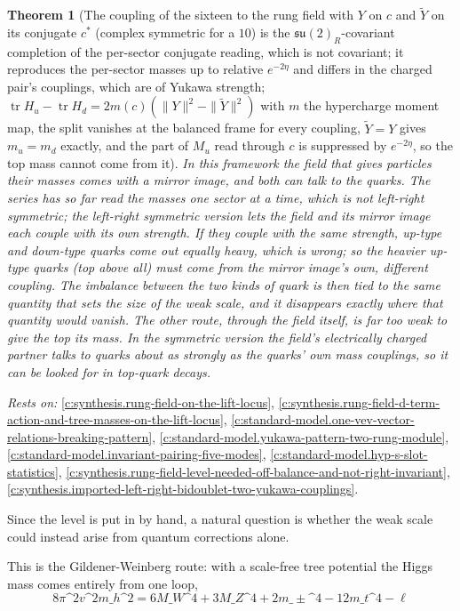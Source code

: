 \documentclass[11pt]{article}
\newtheorem{theorem}{Theorem}[section]
\theoremstyle{definition}
\theoremstyle{plain}
\providecommand{\su}{}\renewcommand{\su}{\mathfrak{su}}
\providecommand{\tr}{}\renewcommand{\tr}{\operatorname{tr}}
\begin{document}
\begin{theorem}[The coupling of the sixteen to the rung field with $Y$ on $c$ and $\tilde{Y}$ on its conjugate $c^{*}$ (complex symmetric for a $10$) is the $\su(2)_{R}$-covariant completion of the per-sector conjugate reading, which is not covariant; it reproduces the per-sector masses up to relative $e^{-2\eta}$ and differs in the charged pair's couplings, which are of Yukawa strength; $\tr H_{u} - \tr H_{d} = 2m(c)(\|Y\|^{2} - \|\tilde{Y}\|^{2})$ with $m$ the hypercharge moment map, the split vanishes at the balanced frame for every coupling, $\tilde{Y} = Y$ gives $m_{u} = m_{d}$ exactly, and the part of $M_{u}$ read through $c$ is suppressed by $e^{-2\eta}$, so the top mass cannot come from it]\label{c:synthesis.rung-field-coupling-to-its-conjugate-is-the-second-family-matrix}
In this framework the field that gives particles their masses comes with a mirror image, and both can talk to the quarks. The series has so far read the masses one sector at a time, which is not left-right symmetric; the left-right symmetric version lets the field and its mirror image each couple with its own strength. If they couple with the same strength, up-type and down-type quarks come out equally heavy, which is wrong; so the heavier up-type quarks (top above all) must come from the mirror image's own, different coupling. The imbalance between the two kinds of quark is then tied to the same quantity that sets the size of the weak scale, and it disappears exactly where that quantity would vanish. The other route, through the field itself, is far too weak to give the top its mass. In the symmetric version the field's electrically charged partner talks to quarks about as strongly as the quarks' own mass couplings, so it can be looked for in top-quark decays.
\end{theorem}
\noindent\emph{Rests on:} \ref{c:synthesis.rung-field-on-the-lift-locus}, \ref{c:synthesis.rung-field-d-term-action-and-tree-masses-on-the-lift-locus}, \ref{c:standard-model.one-vev-vector-relations-breaking-pattern}, \ref{c:standard-model.yukawa-pattern-two-rung-module}, \ref{c:standard-model.invariant-pairing-five-modes}, \ref{c:standard-model.hyp-s-slot-statistics}, \ref{c:synthesis.rung-field-level-needed-off-balance-and-not-right-invariant}, \ref{c:synthesis.imported-left-right-bidoublet-two-yukawa-couplings}.

Since the level is put in by hand, a natural question is whether the weak scale could instead arise from quantum corrections alone.

This is the Gildener-Weinberg route: with a scale-free tree potential the Higgs mass comes entirely from one loop, \[ 8\pi\^{}{2}v\^{}{2}m\_{h}\^{}{2} = 6M\_{W}\^{}{4} + 3M\_{Z}\^{}{4} + 2m\_{\pm}\^{}{4} - 12m\_{t}\^{}{4} - \ell \]
\end{document}
